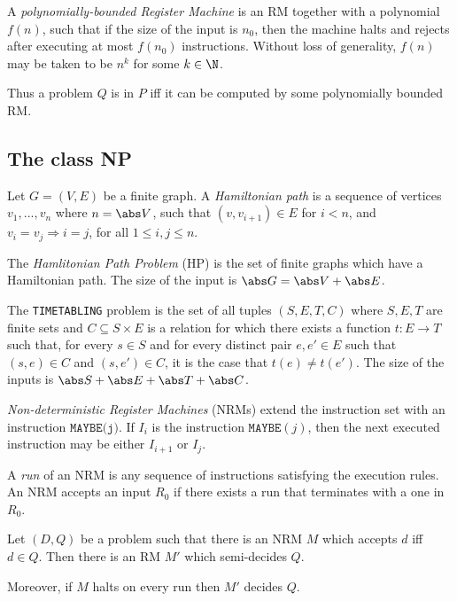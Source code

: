 \documentclass{article}
\begin{document}
\begin{definition}
	A \emph{polynomially-bounded Register Machine} is an RM together with a polynomial $f(n)$,
	such that if the size of the input is $n_0$, then the machine halts and rejects after
	executing at most $f(n_0)$ instructions. Without loss of generality, $f(n)$ may be taken to be
	$n^k$ for some $k\in\N$.

	Thus a problem $Q$ is in $P$ iff it can be computed by some polynomially bounded RM.
\end{definition}

\subsection{The class NP}

\begin{definition}
	Let $G=(V,E)$ be a finite graph. A \emph{Hamiltonian path} is a sequence of vertices
	$v_1,...,v_n$ where $n=\abs V$, such that $(v,v_{i+1})\in E$ for $i<n$, and $v_i=v_j
		\Rightarrow i=j$, for all $1\leq i,j\leq n$.

	The \emph{Hamlitonian Path Problem} (HP) is the set of finite graphs which have a Hamiltonian
	path. The size of the input is $\abs G = \abs V + \abs E$.
\end{definition}

\begin{definition}
	The \texttt{TIMETABLING} problem is the set of all tuples $(S,E,T,C)$ where $S,E,T$ are finite
	sets and $C\subseteq S\times E$ is a relation for which there exists a function $t:E\to T$
	such that, for every $s\in S$ and for every distinct pair $e,e'\in E$ such that $(s,e)\in C$
	and $(s,e')\in C$, it is the case that $t(e)\not=t(e')$.
	The size of the inputs is $\abs S + \abs E + \abs T + \abs C$.
\end{definition}


\begin{definition}
	\emph{Non-deterministic Register Machines} (NRMs) extend the instruction set with an instruction
	$\texttt{MAYBE(j)}$. If $I_i$ is the instruction $\texttt{MAYBE}(j)$, then the next executed instruction
	may be either $I_{i+1}$ or $I_j$.

	A \emph{run} of an NRM is any sequence of instructions satisfying the execution rules. An NRM accepts
	an input $R_0$ if there exists a run that terminates with a one in $R_0$.
\end{definition}

\begin{theorem}[Notes II.10]
	Let $(D,Q)$ be a problem such that there is an NRM $M$ which accepts $d$ iff $d\in Q$.
	Then there is an RM $M'$ which semi-decides $Q$.

	Moreover, if $M$ halts on every run then $M'$ decides $Q$.
\end{theorem}
\end{document}
